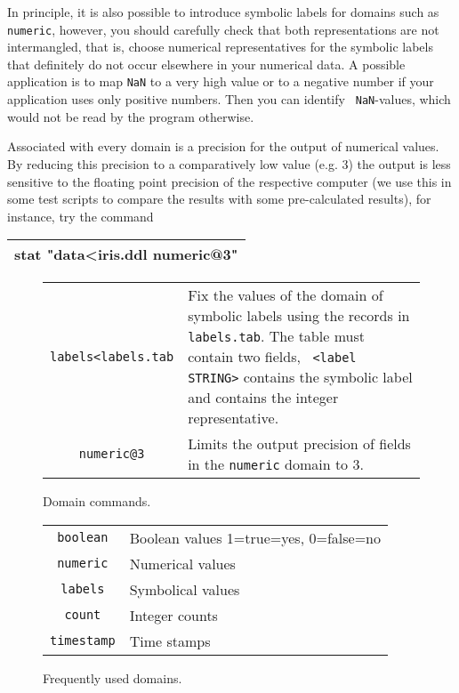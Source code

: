 \documentclass[a4paper]{book}
\newcommand{\cmd}[1]{%
{\vspace{-2mm}\tt\begin{center}\begin{tabular}{||l||}%
\hline%
#1\\%
\hline%
\end{tabular}\end{center}}\vspace{-2mm}}
\begin{document}
In principle, it is also possible to introduce symbolic labels for
domains such as {\tt numeric}, however, you should carefully check
that both representations are not intermangled, that is, choose
numerical representatives for the symbolic labels that definitely do
not occur elsewhere in your numerical data. A possible application is
to map {\tt NaN} to a very high value or to a negative number if your
application uses only positive numbers. Then you can identify {\tt
NaN}-values, which would not be read by the program otherwise.

Associated with every domain is a precision for the output of numerical
values. By reducing this precision to a comparatively low value (e.g. 3) the
output is less sensitive to the floating point precision of the respective
computer (we use this in some test scripts to compare the results with some
pre-calculated results), for instance, try the command \cmd{stat
  "data<iris.ddl numeric@3"}

\begin{figure}[htb]
\begin{center}\begin{tabular}{|c|p{8cm}|}
\hline
{\tt labels<labels.tab} & Fix the values of the domain of symbolic labels
using the records in {\tt labels.tab}. The table must contain two fields, {\tt
  <label STRING>} contains the symbolic label and {\tt <value INT>} contains
the integer representative.
\\
{\tt numeric@3} & Limits the output precision of fields in the {\tt numeric}
domain to 3.
\\
\hline
\end{tabular}
\caption{\label{domcmd:fig}Domain commands.}
\end{center}\end{figure}

\begin{figure}[htb]
\begin{center}\begin{tabular}{|c|p{8cm}|}
\hline
{\tt boolean} & Boolean values 1=true=yes, 0=false=no\\
{\tt numeric} & Numerical values\\
{\tt labels} & Symbolical values\\
{\tt count} & Integer counts\\
{\tt timestamp} & Time stamps\\
\hline
\end{tabular}
\caption{\label{freqdom:fig}Frequently used domains.}
\end{center}\end{figure}
\end{document}
